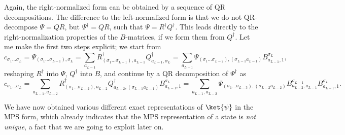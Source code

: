 Again, the right-normalized form can be obtained by a sequence of QR decompositions. The difference to the left-normalized form is that we do not QR-decompose $\Psi=QR$, but $\Psi^\dagger=QR$, such that $\Psi = R^\dagger Q^\dagger$. This leads directly to the right-normalization properties of the $B$-matrices, if we form them from $Q^\dagger$. Let me make the first two steps explicit; we start from
\begin{equation}
c_{\sigma_1\ldots\sigma_L} = \Psi_{(\sigma_1\ldots\sigma_{L-1}),\sigma_L} =
\sum_{a_{L-1}} R^\dagger_{(\sigma_1\ldots\sigma_{L-1}),a_{L-1}} Q^\dagger_{a_{L-1},\sigma_L} =
\sum_{a_{L-1}} \Psi_{(\sigma_1\ldots\sigma_{L-2}),(\sigma_{L-1}a_{L-1})} B^{\sigma_L}_{a_{L-1},1},
\end{equation}
reshaping $R^\dagger$ into $\Psi$, $Q^\dagger$ into $B$, and continue by a QR decomposition of $\Psi^\dagger$ as 
\begin{equation}
c_{\sigma_1\ldots\sigma_L} = \sum_{a_{L-1},a_{L-2}} R^\dagger_{(\sigma_1\ldots\sigma_{L-2}),a_{L-2}} Q^\dagger_{a_{L-2},(\sigma_{L-1}a_{L-1})}  B^{\sigma_L}_{a_{L-1},1} 
= \sum_{a_{L-1},a_{L-2}} \Psi_{(\sigma_1\ldots\sigma_{L-3}),(\sigma_{L-2}a_{L-2})}
B^{\sigma_{L-1}}_{a_{L-2},a_{L-1}} B^{\sigma_L}_{a_{L-1},1} .
\end{equation}

We have now obtained various different exact representations of $\ket{\psi}$ in the MPS form, which already indicates that the MPS representation of a state is {\em not unique}, a fact that we are going to exploit later on.

